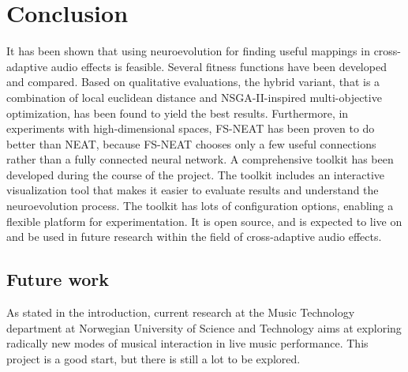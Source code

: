 \chapter{Conclusion}
\label{chapter:conclusion}

It has been shown that using neuroevolution for finding useful mappings in cross-adaptive audio effects is feasible. Several fitness functions have been developed and compared. Based on qualitative evaluations, the hybrid variant, that is a combination of local euclidean distance and NSGA-II-inspired multi-objective optimization, has been found to yield the best results. Furthermore, in experiments with high-dimensional spaces, FS-NEAT has been proven to do better than NEAT, because FS-NEAT chooses only a few useful connections rather than a fully connected neural network. A comprehensive toolkit has been developed during the course of the project. The toolkit includes an interactive visualization tool that makes it easier to evaluate results and understand the neuroevolution process. The toolkit has lots of configuration options, enabling a flexible platform for experimentation. It is open source, and is expected to live on and be used in future research within the field of cross-adaptive audio effects.

\section{Future work}

As stated in the introduction, current research at the Music Technology department at Norwegian University of Science and Technology aims at exploring radically new modes of musical interaction in live music performance. This project is a good start, but there is still a lot to be explored.


